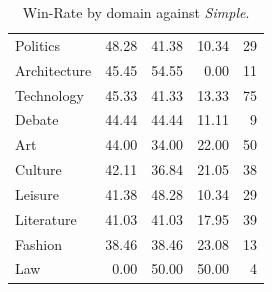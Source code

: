 \begin{table}[t]
\begin{tabular}{l rrrr}
        Politics & 48.28 & 41.38 & 10.34 & 29 \\ 
        Architecture & 45.45 & 54.55 & 0.00 & 11 \\ 
        Technology & 45.33 & 41.33 & 13.33 & 75 \\ 
        Debate & 44.44 & 44.44 & 11.11 & 9 \\ 
        Art & 44.00 & 34.00 & 22.00 & 50 \\ 
        Culture & 42.11 & 36.84 & 21.05 & 38 \\ 
        Leisure & 41.38 & 48.28 & 10.34 & 29 \\ 
        Literature & 41.03 & 41.03 & 17.95 & 39 \\ 
        Fashion & 38.46 & 38.46 & 23.08 & 13 \\ 
        Law & 0.00 & 50.00 & 50.00 & 4 \\ 
        \bottomrule
    \end{tabular}
    \caption{Win-Rate by domain against \textit{Simple}.}
    \label{tab:result-daily-persuasion-per-domain-simple}
\end{table}

